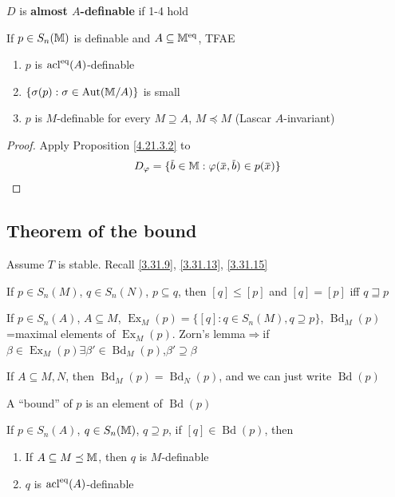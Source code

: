 \documentclass[11pt]{article}
\DeclareMathOperator{\Ex}{Ex}
\DeclareMathOperator{\Bd}{Bd}
\begin{document}
\(D\) is \textbf{almost \(A\)-definable} if 1-4 hold

\begin{proposition}[]
\label{4.21.3.3}
If \(p\in S_n(\mathbb{M})\) is definable and \(A\subseteq\mathbb{M}^{\operatorname{eq}}\), TFAE
\begin{enumerate}
\item \(p\) is \(\operatorname{acl}^{\operatorname{eq}}(A)\)-definable
\item \(\{\sigma(p):\sigma\in\operatorname{\text{Aut}}(\mathbb{M}/A)\}\) is small
\item \(p\) is \(M\)-definable for every \(M\supseteq A\), \(M\preceq M\) (Lascar \(A\)-invariant)
\end{enumerate}
\end{proposition}

\begin{proof}
Apply Proposition \ref{4.21.3.2} to
\begin{equation*}
D_\varphi=\{\barb\in\M:\varphi(\barx,\barb)\in p(\barx)\}
\end{equation*}
\end{proof}
\subsection{Theorem of the bound}
\label{sec:orgb69881d}
Assume \(T\) is stable. Recall \ref{3.31.9}, \ref{3.31.13}, \ref{3.31.15}
\begin{fact}[]
If \(p\in S_n(M)\), \(q\in S_n(N)\), \(p\subseteq q\), then \([q]\le[p]\) and \([q]=[p]\) iff \(q\sqsupseteq p\)
\end{fact}

If \(p\in S_n(A)\), \(A\subseteq M\), \(\Ex_M(p)=\{[q]:q\in S_n(M),q\supseteq p\}\), \(\Bd_M(p)\)=maximal elements
of \(\Ex_M(p)\). Zorn's lemma\(\Rightarrow\)if \(\beta\in\Ex_M(p) \exists\beta'\in\Bd_M(p)\),\(\beta'\supseteq\beta\)

\begin{fact}[]
If \(A\subseteq M,N\), then \(\Bd_M(p)=\Bd_N(p)\), and we can just write \(\Bd(p)\)
\end{fact}

A ``bound'' of \(p\) is an element of \(\Bd(p)\)

\begin{lemma}[]
\label{4.21.4.1}
If \(p\in S_n(A)\), \(q\in S_n(\mathbb{M})\), \(q\supseteq p\), if \([q]\in\Bd(p)\), then
\begin{enumerate}
\item If \(A\subseteq M\preceq\mathbb{M}\), then \(q\) is \(M\)-definable
\item \(q\) is \(\operatorname{acl}^{\operatorname{eq}}(A)\)-definable
\end{enumerate}
\end{lemma}
\end{document}
